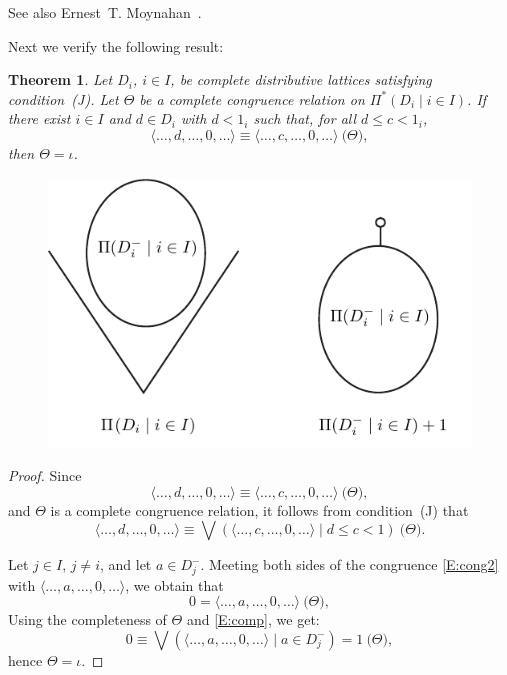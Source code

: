 \documentclass{amsart}
\newtheorem{theorem}{Theorem}
\begin{document}
See also Ernest~T. 
%
Moynahan~\cite{eM57a}.

Next we verify the following result:
%
%
%
\begin{theorem}\label{T:P*} 
Let $D_{i}$, $i \in I$, be complete distributive 
lattices satisfying condition~\textup{(J)}.  
Let $\Theta$ be a complete congruence relation on 
$\Pi^{*} ( D_{i} \mid i \in I )$. 
If there exist $i \in I$ and $d \in D_{i}$ with 
$d < 1_{i}$ such that, for all $d \leq c < 1_{i}$, 
\begin{equation}\label{E:cong1} 
   \langle \dots, d, \dots, 0, \dots \rangle \equiv 
   \langle \dots, c, \dots, 0, \dots \rangle 
   \pod{\Theta}, 
\end{equation}
then $\Theta = \iota$.
\end{theorem}

\begin{figure}[hbt]
\centering\includegraphics{products}
\caption{}\label{Fi:products}
\end{figure}

\begin{proof}
Since 
\begin{equation}\label{E:cong2}
\langle \dots, d, \dots, 0, \dots \rangle \equiv 
\langle \dots, c, \dots, 0, \dots \rangle 
\pod{\Theta}, 
\end{equation}
and $\Theta$ is a complete congruence relation, 
it follows from condition~(J) that
\begin{equation}\label{E:cong}
 \langle \dots, d, \dots, 0, \dots \rangle \equiv
 \bigvee ( \langle \dots, c, \dots, 0, \dots \rangle 
 \mid d \leq c < 1 ) \pod{\Theta}. 
\end{equation}

Let $j \in I$, $j \neq i$, and let $a \in D_{j}^{-}$. 
Meeting both sides of the congruence \eqref{E:cong2} 
with $\langle \dots, a, \dots, 0, \dots \rangle$, 
we obtain that
\begin{equation}\label{E:comp}
   0 = \langle \dots, a, \dots, 0, \dots \rangle 
     \pod{\Theta}, 
\end{equation}
Using the completeness of $\Theta$ and \eqref{E:comp}, 
we get:
\[
   0 \equiv \bigvee ( \langle \dots, a, \dots, 0, 
     \dots \rangle \mid a \in D_{j}^{-} ) = 1 
     \pod{\Theta}, 
\]
hence $\Theta = \iota$.
\end{proof}
\end{document}
